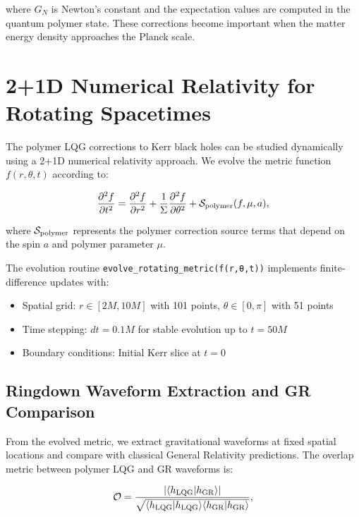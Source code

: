 \documentclass[11pt]{article}
\begin{document}
where $G_N$ is Newton's constant and the expectation values are computed in the quantum polymer state. These corrections become important when the matter energy density approaches the Planck scale.

\section{2+1D Numerical Relativity for Rotating Spacetimes}

The polymer LQG corrections to Kerr black holes can be studied dynamically using a 2+1D numerical relativity approach. We evolve the metric function $f(r,\theta,t)$ according to:

\begin{equation}
\frac{\partial^2 f}{\partial t^2} = \frac{\partial^2 f}{\partial r^2} + \frac{1}{\Sigma}\frac{\partial^2 f}{\partial \theta^2} + \mathcal{S}_{\rm polymer}(f,\mu,a),
\end{equation}

where $\mathcal{S}_{\rm polymer}$ represents the polymer correction source terms that depend on the spin $a$ and polymer parameter $\mu$. 

The evolution routine \texttt{evolve\_rotating\_metric(f(r,θ,t))} implements finite-difference updates with:
\begin{itemize}
\item Spatial grid: $r \in [2M, 10M]$ with 101 points, $\theta \in [0,\pi]$ with 51 points
\item Time stepping: $dt = 0.1M$ for stable evolution up to $t = 50M$
\item Boundary conditions: Initial Kerr slice at $t=0$
\end{itemize}

\subsection{Ringdown Waveform Extraction and GR Comparison}

From the evolved metric, we extract gravitational waveforms at fixed spatial locations and compare with classical General Relativity predictions. The overlap metric between polymer LQG and GR waveforms is:

\begin{equation}
\mathcal{O} = \frac{|\langle h_{\rm LQG}|h_{\rm GR}\rangle|}{\sqrt{\langle h_{\rm LQG}|h_{\rm LQG}\rangle\langle h_{\rm GR}|h_{\rm GR}\rangle}},
\end{equation}
\end{document}

